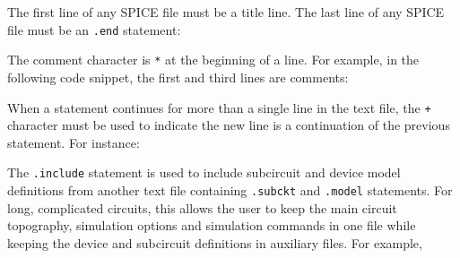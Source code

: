  The first line of any SPICE file must be a title line.  The last line of any SPICE file must be an \texttt{.end} statement: 


 The comment character is \texttt{*} at the beginning of a line.  For example, in the following code snippet, the first and third lines are comments:



 When a statement continues for more than a single line in the text file, the \texttt{+} character must be used to indicate the new line is a continuation of the previous statement.  For instance:



 The \texttt{.include} statement is used to include subcircuit and device model definitions from another text file containing \texttt{.subckt} and \texttt{.model} statements.  For long, complicated circuits, this allows the user to keep the main circuit topography, simulation options and simulation commands in one file while keeping the device and subcircuit definitions in auxiliary files.  For example, 

 
